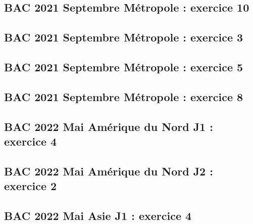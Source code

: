 \documentclass[lang=fr,edition=teacher,layout=sheet]{mxbook}
\begin{document}
\begingroup\endgroup
\par\bigskip
{}\subsection*{BAC 2021 Septembre Métropole : exercice 10}
\begingroup\endgroup
\par\bigskip
{}\subsection*{BAC 2021 Septembre Métropole : exercice 3}
\begingroup\endgroup
\par\bigskip
{}\subsection*{BAC 2021 Septembre Métropole : exercice 5}
\begingroup\endgroup
\par\bigskip
{}\subsection*{BAC 2021 Septembre Métropole : exercice 8}
\begingroup\endgroup
\par\bigskip
{}\subsection*{BAC 2022 Mai Amérique du Nord J1 : exercice 4}
\begingroup\endgroup
\par\bigskip
{}\subsection*{BAC 2022 Mai Amérique du Nord J2 : exercice 2}
\begingroup\endgroup
\par\bigskip
{}\subsection*{BAC 2022 Mai Asie J1 : exercice 4}
\end{document}
